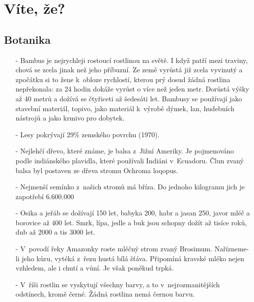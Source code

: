 
\section{Víte, že?}
\begin{multicols}{2}

\subsection{Botanika}

\begin{itemize}
\itemsep -3pt

\item[-] Bambus je nejrychleji rostoucí rostlinou na světě. I když 
patří mezi traviny, chová se zcela jinak než jeho příbuzní. Ze 
země vyrůstá již zcela vyvinutý a zpočátku si to žene k~obloze 
rychlostí, kterou prý dosud žádná rostlina nepřekonala: za 24 
hodin dokáže vyrůst o více než jeden metr. Dorůstá výšky až 40 
metrů a dožívá se čtyřiceti až šedesáti let. Bambusy se používají 
jako stavební materiál, topivo, jako materiál k~výrobě 
dýmek, lan, hudebních nástrojů a jako krmivo pro dobytek.

\item[-] Lesy pokrývají 29\% zemského povrchu (1970).

\item[-] Nejlehčí dřevo, které známe, je balsa z~Jižní Ameriky. 
Je pojmenováno podle indiánského plavidla, které používali Indiáni 
v~Ecuadoru. Člun zvaný balsa byl postaven ze dřeva stromu 
Ochroma loqopus.

\item[-] Nejmenší semínko z~našich stromů má bříza. Do jednoho 
kilogramu jich je zapotřebí 6.600.000

\item[-] Osika a jeřáb se dožívají 150 let, babyka 200, habr a jasan 250, 
javor mléč a borovice až 400 let. Smrk, lípa, jedle a buk jsou 
schopny dožít až tisíce roků, dub až 2000 a tis 3000 let.

\item[-] V~povodí řeky Amazonky roste mléčný strom zvaný Brosimum. 
Nařízneme-li jeho kůru, vytéká z~řezu hustá bílá šťáva. 
Připomíná kravské mléko nejen vzhledem, ale i chutí a vůní. Je 
však poněkud trpká.

\item[-] V~říši rostlin se vyskytují všechny barvy, a to v~nejrozmanitějších 
odstínech, kromě černé. Žádná rostlina nemá černou barvu.


\end{itemize}
\end{multicols}
